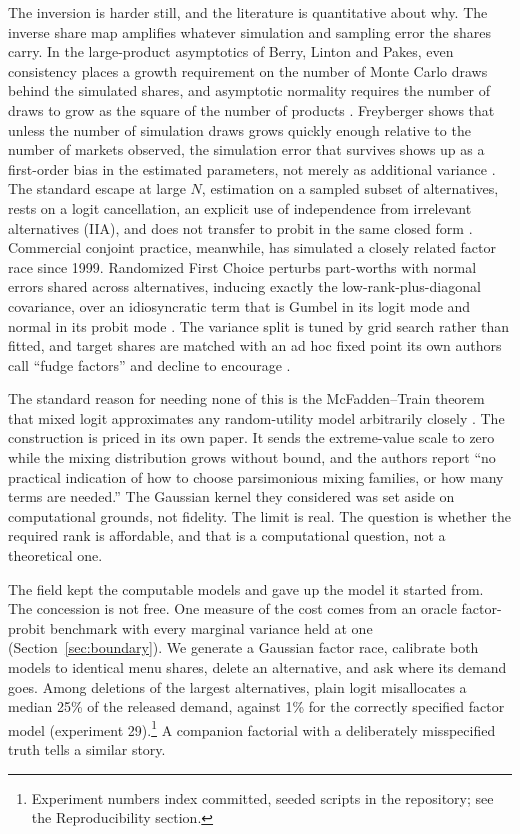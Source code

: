 \documentclass[12pt]{article}
\theoremstyle{remark}
\begin{document}
The inversion is harder still, and the literature is quantitative about
why. The inverse share map amplifies whatever simulation and sampling
error the shares carry. In the large-product asymptotics of Berry,
Linton and Pakes, even consistency places a growth requirement on the
number of Monte Carlo draws behind the simulated shares, and asymptotic
normality requires the number of draws to grow as the square of the
number of products \citep{berry2004}. Freyberger shows that unless the
number of simulation draws grows quickly enough relative to the number
of markets observed, the simulation error that survives shows up as a
first-order bias in the estimated parameters, not merely as additional
variance \citep{freyberger2015}. The standard
escape at large $N$, estimation on a sampled subset of alternatives,
rests on a logit cancellation, an explicit use of independence from
irrelevant alternatives (IIA), and does not transfer to probit in the
same closed form \citep{train2009}. Commercial conjoint practice,
meanwhile, has simulated a closely related factor race since 1999.
Randomized First Choice perturbs part-worths with normal errors shared
across alternatives, inducing exactly the low-rank-plus-diagonal
covariance, over an idiosyncratic term that is Gumbel in its logit mode
and normal in its probit mode \citep{huber1999}. The variance split is
tuned by grid search rather than fitted, and target shares are matched
with an ad hoc fixed point its own authors call ``fudge factors'' and
decline to encourage \citep{orme2006}.

The standard reason for needing none of this is the McFadden--Train
theorem that mixed logit approximates any random-utility model
arbitrarily closely \citep{mcfaddentrain2000}. The construction is priced in its
own paper. It sends the extreme-value scale to zero while the mixing
distribution grows without bound, and the authors report ``no practical
indication of how to choose parsimonious mixing families, or how many
terms are needed.'' The Gaussian kernel they considered was set aside
on computational grounds, not fidelity. The limit is real. The question
is whether the required rank is affordable, and that is a computational
question, not a theoretical one.

The field kept the computable models and gave up the model it started
from. The concession is not free. One measure of the cost comes from an
oracle factor-probit benchmark with every marginal variance held at one
(Section~\ref{sec:boundary}). We generate a Gaussian factor race,
calibrate both models to identical menu shares, delete an alternative,
and ask where its demand goes. Among deletions of the largest
alternatives, plain logit misallocates a median 25\% of the released
demand, against 1\% for the correctly specified factor model
(experiment 29).\footnote{Experiment numbers index committed, seeded
scripts in the repository; see the Reproducibility section.} A
companion factorial with a deliberately misspecified truth tells a
similar story.
\end{document}
